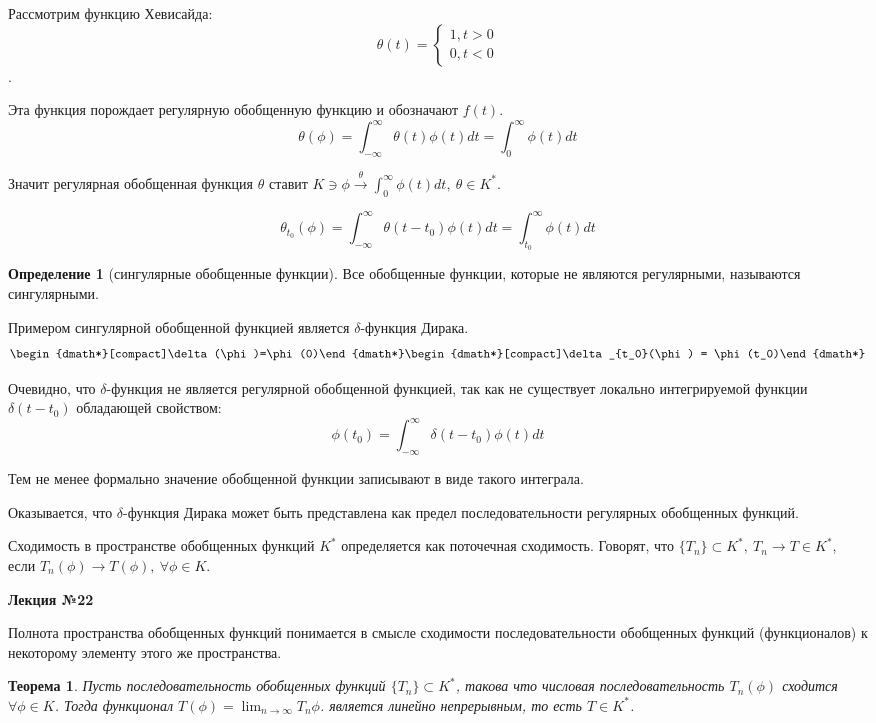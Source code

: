 \documentclass[14pt,a4paper]{extarticle}
\newtheorem{theorem}{Теорема}[section]
\theoremstyle{definition}
\newtheorem{definition}{Определение}[section]
\theoremstyle{remark}
\renewcommand{\[}{\begin{dmath*}[compact]}
\renewcommand{\]}{\end{dmath*}}
\newcommand{\bdg}{\begin{dgroup*}}
\newcommand{\edg}{\end{dgroup*}}
\newcommand{\ds}{\displaystyle}
\newcommand{\sep}{ , \ \allowbreak }
\begin{document}
Рассмотрим функцию Хевисайда:
\[\theta (t) = \begin{cases}
1, t>0 \\ 0, t<0\end{cases}\].

Эта функция порождает регулярную обобщенную функцию и обозначают $f(t)$.
\[\theta (\phi) = \int_{-\infty}^\infty \theta (t)\phi(t)dt
= \int_0^\infty \phi(t)dt\]

Значит регулярная обобщенная функция $\theta$ ставит
$K \ni \phi \overset{\theta}{\to} \int_0^\infty \phi(t) dt \sep \theta \in K^*$.

\[\theta _{t_0}(\phi)=\int_{-\infty}^\infty \theta (t-t_0)\phi(t)dt
= \int_{t_0}^\infty \phi (t)dt\]

\begin{definition}[сингулярные обобщенные функции]
  Все обобщенные функции, которые не являются регулярными,
  называются сингулярными.
\end{definition}

Примером сингулярной обобщенной функцией является $\delta$-функция Дирака.
\bdg
\[\delta(\phi)=\phi(0)\]
\[\delta_{t_0}(\phi) = \phi(t_0)\]
\edg

Очевидно, что $\delta$-функция не является регулярной обобщенной функцией,
так как не существует локально интегрируемой функции $\delta(t-t_0)$
обладающей свойством:
\[\phi(t_0) = \int_{-\infty}^\infty \delta (t-t_0)\phi(t)dt\]

Тем не менее формально значение обобщенной функции записывают в виде
такого интеграла.

Оказывается, что $\delta$-функция Дирака может быть представлена как
предел последовательности регулярных обобщенных функций.

Сходимость в пространстве обобщенных функций $K^*$ определяется
как поточечная сходимость.
Говорят, что $\{T_n\} \subset K^* \sep T_n \to T \in K^*$,
если $T_n(\phi) \to T(\phi) \sep \forall \phi \in K$.

\textbf{Лекция №22}

Полнота пространства обобщенных функций понимается в смысле сходимости
последовательности обобщенных функций (функционалов) к
некоторому элементу этого же пространства.

\begin{theorem}
  Пусть последовательность обобщенных функций $\{T_n\}\subset K^*$,
  такова что числовая последовательность
  $T_n(\phi)$ сходится $\forall \phi \in K$.
  Тогда функционал $\ds T(\phi) = \lim_{n \to \infty} T_n{\phi}$.
  является линейно непрерывным, то есть $T\in K^*$.
\end{theorem}
\end{document}
